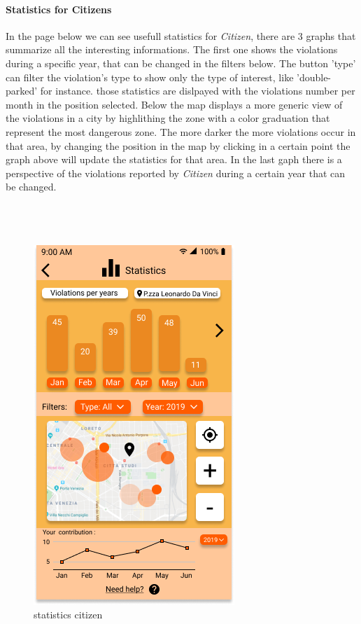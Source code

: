 \documentclass{article}
\begin{document}
\paragraph{Statistics for Citizens}
In the page below we can see usefull statistics for \textit{Citizen}, there are 3 graphs that summarize all the interesting
informations. The first one shows the violations during a specific year, that can be changed in the filters below. 
The button 'type' can filter the violation's type to show only the type of interest, like 'double-parked' for instance. 
those statistics are dislpayed with the violations number per month in the position selected. Below the map displays
a more generic view of the violations in a city by highlithing the zone with a color graduation that represent the most
dangerous zone. The more darker the more violations occur in that area, by changing the position in the map by clicking 
in a certain point the graph above will update the statistics for that area.  In the last gaph there is a perspective of 
the violations reported by \textit{Citizen} during a certain year that can be changed.
\\
\\
\\
\\
\begin{figure}[H]
    \centering
    \includegraphics[scale=0.5]{img/mockups/statistics_citizen.png}
    \caption{statistics citizen}
\end{figure}
\end{document}
